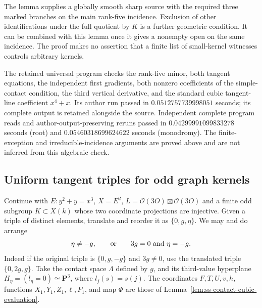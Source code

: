 \begin{remark}
\label{rem:DE-A4-uniform-triple-local-scope}
The lemma supplies a globally smooth sharp source with the required
three marked branches on the main rank-five incidence.
Exclusion of other identifications under the full quotient by $K$
is a further geometric condition.  It can be combined with this
lemma once it gives a nonempty open on the same incidence.
The proof makes no assertion that a finite list of small-kernel
witnesses controls arbitrary kernels.

The retained universal program
checks the rank-five minor, both tangent equations, the independent
first gradients, both nonzero coefficients of the simple-contact
condition, the third vertical derivative, and the standard cubic
tangent-line coefficient $x^4+x$.
Its author run passed in $0.0512757739998051$ seconds; its complete
output is retained alongside the source.
Independent complete program reads and author-output-preserving reruns
passed in $0.04299991099833278$ seconds (root) and
$0.05460318699624622$ seconds (monodromy).
The finite-exception and irreducible-incidence arguments are proved
above and are not inferred from this algebraic check.
\end{remark}


\subsection{Uniform tangent triples for odd graph kernels}
\label{subsec:ss-uniform-tangent-triples}

Continue with $E:y^2+y=x^3$, $X=E^2$, $L=\mathcal O(3O)\boxtimes
\mathcal O(3O)$ and a finite odd subgroup $K\subset X(k)$ whose
two coordinate projections are injective. Given a triple of distinct
elements, translate and reorder it as $\{0,g,\eta\}$.
We may and do arrange
\[
 \eta\ne-g,\qquad\hbox{or}\qquad 3g=0\ \hbox{and}\ \eta=-g.
\]
Indeed if the original triple is $\{0,g,-g\}$ and $3g\ne0$, use
the translated triple $\{0,2g,g\}$. Take the contact space
$\Lambda$ defined by $g$, and its third-value hyperplane
$H_\eta=(l_\eta=0)\simeq\mathbf P^3$, where $l_j(s)=s(j)$.
The coordinates $F,T,U,v,h$, functions $X_1,Y_1,Z_1,\ell,P_1$,
and map $\Phi$ are those of
Lemma~\ref{lem:ss-contact-cubic-evaluation}.


